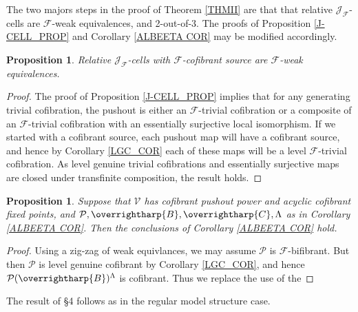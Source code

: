 \documentclass[a4paper,10pt
,draft
]{article}%
\numberwithin{equation}{section}
\numberwithin{figure}{section}
\newtheorem{proposition}[equation]{Proposition}%
\theoremstyle{definition} %
\newcommand{\vect}[1]{\text{\overrightharp{\ensuremath{#1}}}}
\newcommand{\F}{\ensuremath{\mathcal F}}
\newcommand{\V}{\ensuremath{\mathcal V}}
\renewcommand{\P}{\ensuremath{\mathcal P}}
\newcommand{\1}{\ensuremath{\mathbbm 1}}%
\begin{document}
The two majors steps in the proof of Theorem \ref{THMII} are that that relative $\mathcal J_\F$-cells are $\F$-weak equivalences, and 2-out-of-3.
The proofs of Proposition \ref{J-CELL_PROP} and Corollary \ref{ALBEETA COR} may be modified accordingly.

\begin{proposition}
      Relative $\mathcal J_\F$-cells with $\F$-cofibrant source are $\F$-weak equivalences.
\end{proposition}
\begin{proof}
      The proof of Proposition \ref{J-CELL_PROP} implies that for any generating trivial cofibration,
      the pushout is either an $\F$-trivial cofibration or a composite of an $\F$-trivial cofibration with an essentially surjective local isomorphism.
      If we started with a cofibrant source, each pushout map will have a cofibrant source,
      and hence by Corollary \ref{LGC_COR} each of these maps will be a level $\F$-trivial cofibration.
      As level genuine trivial cofibrations and essentially surjective maps are closed under transfinite composition, the result holds.
\end{proof}

\begin{proposition}
      Suppose that $\V$ has cofibrant pushout power and acyclic cofibrant fixed points,
      and $\P, \vect B, \vect C, \Lambda$ as in Corollary \ref{ALBEETA COR}.
      Then the conclusions of Corollary \ref{ALBEETA COR} hold.
\end{proposition}
\begin{proof}
      Using a zig-zag of weak equivlances, we may assume $\P$ is $\F$-bifibrant.
      But then $\P$ is level genuine cofibrant by Corollary \ref{LGC_COR},
      and hence $\P(\vect B)^\Lambda$ is cofibrant.
      Thus we replace the use of the 
\end{proof}

The result of \S 4 follows as in the regular model structure case.
\end{document}
